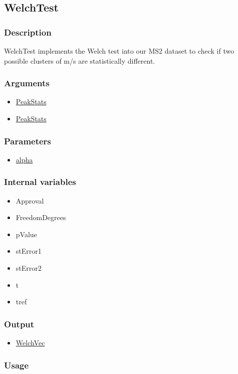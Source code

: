 \subsection{WelchTest}\label{WelchTest}
\subsubsection{Description}

WelchTest implements the Welch test into our MS2 dataset to check if two possible clusters of m/s are statistically different.
\subsubsection{Arguments}
\begin{itemize}
\item \hyperref[PeakStats1]{PeakStats}
\item \hyperref[PeakStats2]{PeakStats}
\end{itemize}
\subsubsection{Parameters}
\begin{itemize}
\item \hyperref[alpha]{alpha}
\end{itemize}
\subsubsection{Internal variables}
\begin{itemize}
\item Approval
\item FreedomDegrees
\item pValue
\item stError1
\item stError2
\item t
\item tref
\end{itemize}
\subsubsection{Output}
\begin{itemize}
\item \hyperref[WelchVec]{WelchVec} 
\end{itemize}
\subsubsection{Usage}
